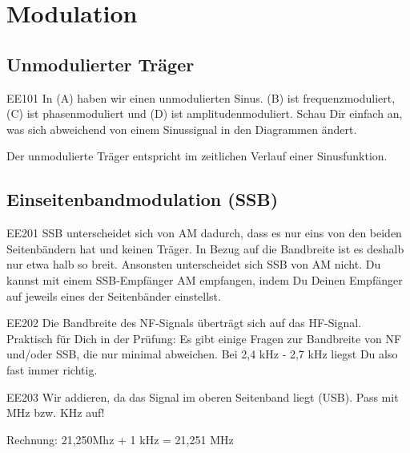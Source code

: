 
\setcounter{section}{8}
\section{Modulation} \label{sec:modulation}
\subsection{Unmodulierter Träger}


\begin{sol}{EE101}
  In (A) haben wir einen unmodulierten Sinus. (B) ist frequenzmoduliert, (C) ist phasenmoduliert und (D) ist amplitudenmoduliert. Schau Dir einfach an, was sich abweichend von einem Sinussignal in den Diagrammen ändert.
\end{sol}

\begin{ohmchapter}
  Der unmodulierte Träger entspricht im zeitlichen Verlauf einer Sinusfunktion.

\end{ohmchapter}  

\subsection{Einseitenbandmodulation (SSB)}

\begin{sol}{EE201}
  SSB unterscheidet sich von AM dadurch, dass es nur eins von den beiden Seitenbändern hat und keinen Träger. In Bezug auf die Bandbreite ist es deshalb nur etwa halb so breit. Ansonsten unterscheidet sich SSB von AM nicht. Du kannst mit einem SSB-Empfänger AM empfangen, indem Du Deinen Empfänger auf jeweils eines der Seitenbänder einstellst.
\end{sol}

\begin{sol}{EE202}
  Die Bandbreite des NF-Signals überträgt sich auf das HF-Signal. Praktisch für Dich in der Prüfung: Es gibt einige Fragen zur Bandbreite von NF und/oder SSB, die nur minimal abweichen. Bei 2,4 kHz - 2,7 kHz liegst Du also fast immer richtig.

\end{sol}

\begin{sol}{EE203}
  Wir addieren, da das Signal im oberen Seitenband liegt (USB). Pass mit MHz bzw. KHz auf!
  
  Rechnung: 21,250Mhz + 1 kHz = 21,251 MHz 
\end{sol}


